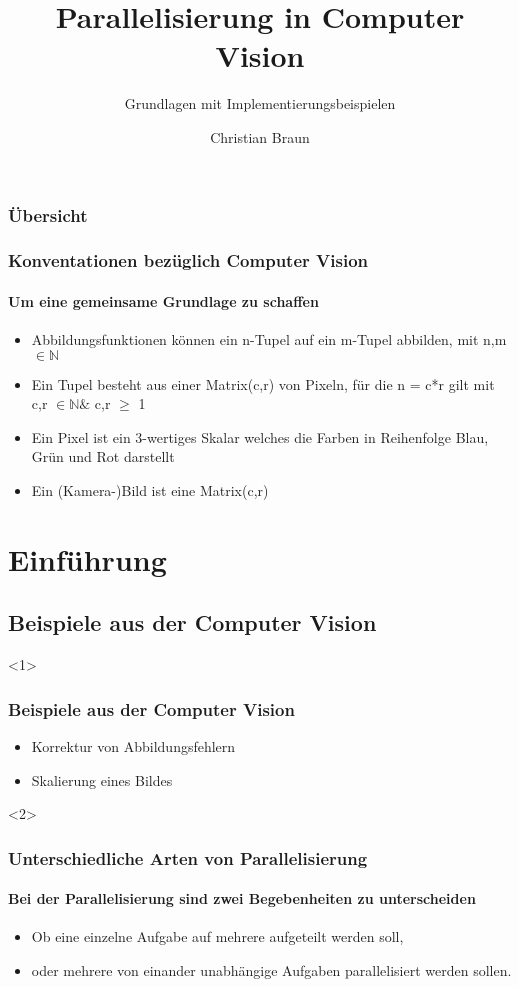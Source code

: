 \documentclass{beamer}
\title{Parallelisierung in Computer Vision}
\subtitle{Grundlagen mit Implementierungsbeispielen}
\author[Braun]{Christian Braun}
\begin{document}
\begin{frame}
  \titlepage
\end{frame}

\begin{frame}
  \frametitle{Übersicht}
  \tableofcontents
\end{frame}

\begin{frame}
  \frametitle{Konventationen bezüglich Computer Vision}
  \framesubtitle{Um eine gemeinsame Grundlage zu schaffen}
  \begin{itemize}
    \item Abbildungsfunktionen können ein n-Tupel auf ein m-Tupel abbilden, mit n,m $\in \mathbb{N}$
    \item Ein Tupel besteht aus einer Matrix(c,r) von Pixeln, für die n = c*r gilt mit c,r $\in \mathbb{N} \&$ c,r $\geq$ 1
    \item Ein Pixel ist ein 3-wertiges Skalar welches die Farben in Reihenfolge Blau, Grün und Rot darstellt
    \item Ein (Kamera-)Bild ist eine Matrix(c,r) 
  \end{itemize}
\end{frame}

\section{Einführung}
\subsection{Beispiele aus der Computer Vision}
\begin{frame}<1>
  \frametitle{Beispiele aus der Computer Vision}
  \begin{itemize}
    \item Korrektur von Abbildungsfehlern
    \item Skalierung eines Bildes
  \end{itemize}
\end{frame}

\begin{frame}<2>
  \frametitle{Unterschiedliche Arten von Parallelisierung}
  \framesubtitle{Bei der Parallelisierung sind zwei Begebenheiten zu unterscheiden}
  \begin{itemize}
    \item Ob eine einzelne Aufgabe auf mehrere aufgeteilt werden soll, 
    \item oder mehrere von einander unabhängige Aufgaben parallelisiert werden sollen.
  \end{itemize}

\end{frame}
\end{document}
